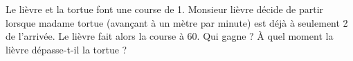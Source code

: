 
\begin{exercice}\label{exosmath-0626}

    Le lièvre et la tortue font une course de \unit{1}{\kilo\meter}. Monsieur lièvre décide de partir lorsque madame tortue (avançant à un mètre par minute) est déjà à seulement \unit{2}{\meter} de l'arrivée. Le lièvre fait alors la course à \unit{60}{\kilo\meter\per\hour}. Qui gagne ? À quel moment la lièvre dépasse-t-il la tortue ?

\end{exercice}
